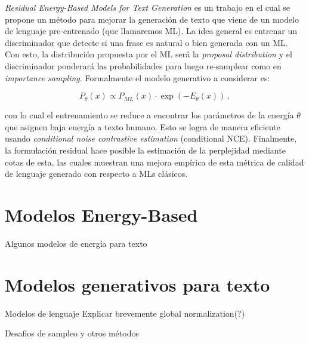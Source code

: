 \documentclass[letterpaper,11pt,oneside]{article}
\theoremstyle{break}
\begin{document}
	





\inserttitle

\textit{Residual Energy-Based Models for Text Generation} es un trabajo en el cual se propone un método para mejorar la generación de texto que viene de un modelo de lenguaje pre-entrenado (que llamaremos ML). La idea general es entrenar un discriminador que detecte si una frase es natural o bien generada con un ML. Con esto, la distribución propuesta por el ML será la \textit{proposal distribution} y el discriminador ponderará las probabilidades para luego re-samplear como en \textit{importance sampling}. Formalmente el modelo generativo a considerar es:

$$ P_\theta(x) \propto P_{ML}(x) \cdot \exp(-E_\theta(x)) \,,$$

con lo cual el entrenamiento se reduce a encontrar los parámetros de la energía $\theta$ que asignen baja energía a texto humano. Esto se logra de manera eficiente usando \textit{conditional noise contrastive estimation} (conditional NCE). Finalmente, la formulación residual hace posible la estimación de la perplejidad mediante cotas de esta, las cuales muestran una mejora empírica de esta métrica de calidad de lenguaje generado con respecto a MLs clásicos.

\section{Modelos Energy-Based}
\lipsum[1]

Algunos modelos de energía para texto

\lipsum[1]

\section{Modelos generativos para texto}
\iffalse
\subsection{Modelos de lenguaje}
\fi
Modelos de lenguaje Explicar brevemente global normalization(?)

\lipsum[2]

\iffalse
\subsection{Desafios de sampleo y otros métodos}
\fi
Desafios de sampleo y otros métodos
\lipsum[3]
\end{document}
